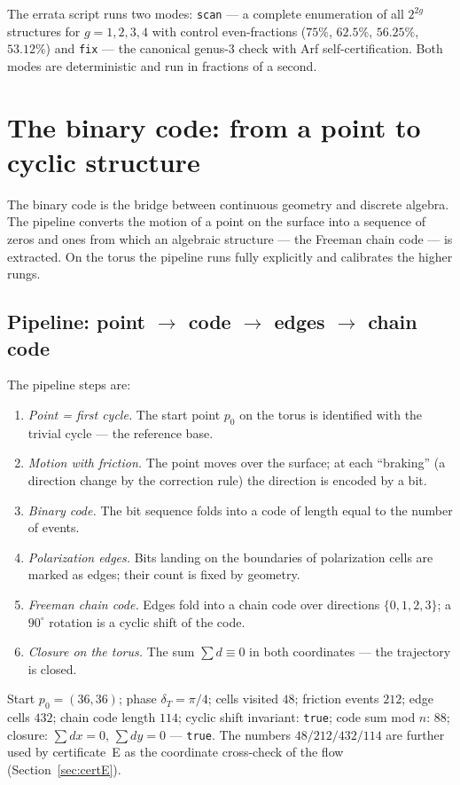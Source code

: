 The errata script runs two modes: \texttt{scan} --- a complete
enumeration of all $2^{2g}$ structures for $g=1,2,3,4$ with control
even-fractions ($75\%$, $62.5\%$, $56.25\%$, $53.12\%$) and
\texttt{fix} --- the canonical genus-3 check with Arf
self-certification. Both modes are deterministic and run in
fractions of a second.

\section{The binary code: from a point to cyclic structure}
\label{sec:binary}

The binary code is the bridge between continuous geometry and
discrete algebra. The pipeline converts the motion of a point on the
surface into a sequence of zeros and ones from which an algebraic
structure --- the Freeman chain code --- is extracted. On the torus
the pipeline runs fully explicitly and calibrates the higher rungs.

\subsection{Pipeline: point $\to$ code $\to$ edges $\to$ chain code}

The pipeline steps are:
\begin{enumerate}[leftmargin=2.2em]
\item \emph{Point = first cycle.} The start point $p_0$ on the torus
  is identified with the trivial cycle --- the reference base.
\item \emph{Motion with friction.} The point moves over the
  surface; at each ``braking'' (a direction change by the correction
  rule) the direction is encoded by a bit.
\item \emph{Binary code.} The bit sequence folds into a code of
  length equal to the number of events.
\item \emph{Polarization edges.} Bits landing on the boundaries of
  polarization cells are marked as edges; their count is fixed by
  geometry.
\item \emph{Freeman chain code.} Edges fold into a chain code over
  directions $\{0,1,2,3\}$; a $90^\circ$ rotation is a cyclic shift
  of the code.
\item \emph{Closure on the torus.} The sum $\sum d\equiv0$ in both
  coordinates --- the trajectory is closed.
\end{enumerate}

\begin{databox}
Start $p_0=(36,36)$; phase $\delta_T=\pi/4$; cells visited $48$;
friction events $212$; edge cells $432$; chain code length $114$;
cyclic shift invariant: \texttt{true}; code sum mod $n$: $88$;
closure: $\sum dx=0$, $\sum dy=0$ --- \texttt{true}. The numbers
$48/212/432/114$ are further used by certificate~E as the
coordinate cross-check of the flow (Section~\ref{sec:certE}).
\end{databox}

